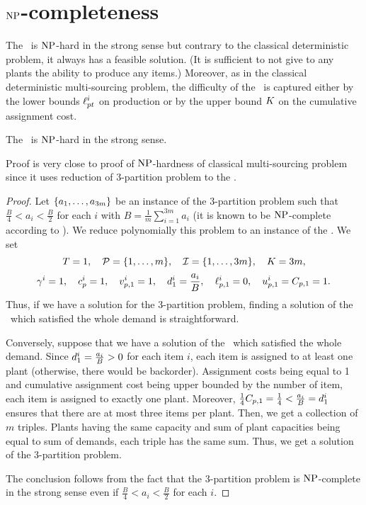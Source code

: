 \section{$\operatorname{NP}$-completeness}
\label{sec:multi-sourcing-limited-capital:NP-completeness}


The \tbc\ is $\operatorname{NP}$-hard in the strong sense but contrary to the classical deterministic problem, it always has a feasible solution.
(It is sufficient to not give to any plants the ability to produce any items.)
Moreover, as in the classical deterministic multi-sourcing problem, the difficulty of the \tbc\ is captured either by the lower bounds $\ell_{pt}^i$ on production or by the upper bound $K$ on the cumulative assignment cost.


\begin{thm}\label{thm:det-multi-sourcing:limited-capital:strong-NP-hard}
  The \tbc\ is $\operatorname{NP}$-hard in the strong sense.
\end{thm}


Proof is very close to proof of $\operatorname{NP}$-hardness of classical multi-sourcing problem since it uses reduction of 3-partition problem to the \tbc.


\begin{proof}
Let $\crbracket{a_1,\ldots,a_{3m}}$ be an instance of the 3-partition problem such that $\frac{B}{4} < a_i < \frac{B}{2}$ for each $i$ with $B=\frac{1}{m}\sum_{i=1}^{3m}a_i$ (it is known to be $\operatorname{NP}$-complete according to \cite{Garey1979}).
We reduce polynomially this problem to an instance of the \tbc.
We set
$$
  \horizon=1
  ,\quad
  \plants=\range[1]{m}
  ,\quad
  \REF=\range[1]{3m}
  ,\quad
  \capital = 3m,
$$
$$
  \gamma^i=1
  ,\quad
  c_p^i=1
  ,\quad
  v_{p,1}^i=1
  ,\quad
  d_1^i=\frac{a_i}{B}
  ,\quad
  \ell_{p,1}^i=0
  ,\quad
  u_{p,1}^i=C_{p,1}=1.
$$
Thus, if we have a solution for the 3-partition problem, finding a solution of the \tbc\ which satisfied the whole demand is straightforward.

Conversely, suppose that we have a solution of the \tbc\ which satisfied the whole demand.
Since $d_1^i=\frac{a_i}{B}>0$ for each item $i$, each item is assigned to at least one plant (otherwise, there would be backorder).
Assignment costs being equal to 1 and cumulative assignment cost being upper bounded by the number of item, each item is assigned to exactly one plant.
Moreover, $\frac{1}{4}C_{p,1}=\frac{1}{4} < \frac{a_i}{B}=d_1^i$ ensures that there are at most three items per plant.
Then, we get a collection of $m$ triples.
Plants having the same capacity and sum of plant capacities being equal to sum of demands, each triple has the same sum.
Thus, we get a solution of the 3-partition problem.

The conclusion follows from the fact that the 3-partition problem is $\operatorname{NP}$-complete in the strong sense even if $\frac{B}{4} < a_i < \frac{B}{2}$ for each $i$.
\end{proof}


